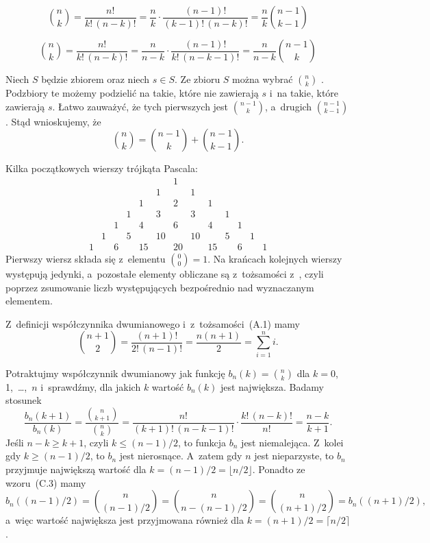 \exercise %
\[
	\binom{n}{k} = \frac{n!}{k!\,(n-k)!} = \frac{n}{k}\cdot\frac{(n-1)!}{(k-1)!\,(n-k)!} = \frac{n}{k}\binom{n-1}{k-1}
\]

\exercise %
\[
	\binom{n}{k} = \frac{n!}{k!\,(n-k)!} = \frac{n}{n-k}\cdot\frac{(n-1)!}{k!\,(n-k-1)!} = \frac{n}{n-k}\binom{n-1}{k}
\]

\exercise %
Niech $S$ będzie zbiorem  oraz niech $s\in S$. Ze zbioru $S$ można wybrać $\binom{n}{k}$ . Podzbiory te możemy podzielić na takie, które nie zawierają $s$ i~na takie, które zawierają $s$. Łatwo zauważyć, że tych pierwszych jest $\binom{n-1}{k}$, a~drugich $\binom{n-1}{k-1}$. Stąd wnioskujemy, że
\[
    \binom{n}{k} = \binom{n-1}{k}+\binom{n-1}{k-1}.
\]

\exercise %
Kilka początkowych wierszy trójkąta Pascala:
\[
	\begin{array}{ccccccccccccc}
		&&&&&& 1 \\
		&&&&& 1 && 1 \\
		&&&& 1 && 2 && 1 \\
		&&& 1 && 3 && 3 && 1 \\
		&& 1 && 4 && 6 && 4 && 1 \\
		& 1 && 5 && 10 && 10 && 5 && 1 \\
		1 && 6 && 15 && 20 && 15 && 6 && 1
	\end{array}
\]
Pierwszy wiersz składa się z~elementu $\binom{0}{0}=1$. Na krańcach kolejnych wierszy występują jedynki, a~pozostałe elementy obliczane są z~tożsamości z~, czyli poprzez zsumowanie liczb występujących bezpośrednio nad wyznaczanym elementem.

\exercise %
Z~definicji współczynnika dwumianowego i~z~tożsamości~(A.1) mamy
\[
	\binom{n+1}{2} = \frac{(n+1)!}{2!\,(n-1)!} = \frac{n(n+1)}{2} = \sum_{i=1}^ni.
\]

\exercise %
Potraktujmy współczynnik dwumianowy jak funkcję $b_n(k)=\binom{n}{k}$ dla $k=0$, 1,~\dots,~$n$ i~sprawdźmy, dla jakich $k$ wartość $b_n(k)$ jest największa. Badamy stosunek
\[
	\frac{b_n(k+1)}{b_n(k)} = \frac{\binom{n}{k+1}}{\binom{n}{k}} = \frac{n!}{(k+1)!\,(n-k-1)!}\cdot\frac{k!\,(n-k)!}{n!} = \frac{n-k}{k+1}.
\]
Jeśli $n-k\ge k+1$, czyli $k\le(n-1)/2$, to funkcja $b_n$ jest niemalejąca. Z~kolei gdy $k\ge(n-1)/2$, to $b_n$ jest nierosnące. A~zatem gdy $n$ jest nieparzyste, to $b_n$ przyjmuje największą wartość dla $k=(n-1)/2=\lfloor n/2\rfloor$. Ponadto ze wzoru~(C.3) mamy
\[
    b_n((n-1)/2) = \binom{n}{(n-1)/2} = \binom{n}{n-(n-1)/2} = \binom{n}{(n+1)/2} = b_n((n+1)/2),
\]
a~więc wartość największa jest przyjmowana również dla $k=(n+1)/2=\lceil n/2\rceil$.

